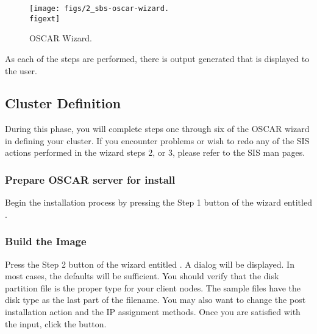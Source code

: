 \begin{figure}[htbp]
  \begin{center}
    \texttt{[image: figs/2\_sbs-oscar-wizard.\\figext]}
    \caption{OSCAR Wizard.}
    \label{fig:detailed-oscar-wizard}
  \end{center}
\end{figure}
  
As each of the steps are performed, there is output generated that is
displayed to the user. 


\subsection{Cluster Definition}
\label{sec:detailed-cluster-def}

During this phase, you will complete steps one through six of the
OSCAR wizard in defining your cluster. If you encounter problems or
wish to redo any of the SIS actions performed in the wizard steps 2,
or 3, please refer to the SIS man pages.

\subsubsection{Prepare OSCAR server for install} 
\label{det:prepareforinstall}
Begin the installation process by pressing the Step 1 button of the wizard entitled .

\subsubsection{Build the Image} 
\label{det:buildimage}

Press the Step 2 button of the wizard entitled . A dialog will be displayed. In most cases, the defaults 
will be sufficient. You should verify that the disk partition file is
the proper type for your client nodes. The sample files have the
disk type as the last part of the filename. You may also want to change
the post installation action and the IP assignment methods.
Once you are satisfied with the input, click the  button.

